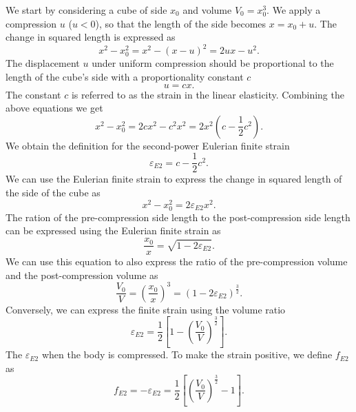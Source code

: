 We start by considering a cube of side $x_0$ and volume $V_0 = x_0^3$. We
apply a compression $u$ ($u < 0$), so that the length of the side becomes
$x = x_0 + u$. The change in squared length is expressed as
\begin{equation}
  x^2 - x_0^2 = x^2 - (x - u)^2 = 2ux - u^2.
\end{equation}
The displacement $u$ under uniform compression should be proportional to the
length of the cube's side with a proportionality constant $c$
\begin{equation}
  u = cx.
\end{equation}
The constant $c$ is referred to as the strain in the linear elasticity.
Combining the above equations we get
\begin{equation}
  x^2 - x_0^2 = 2cx^2 - c^2x^2 = 2x^2(c - \frac{1}{2}c^2).
\end{equation}
We obtain the definition for the second-power Eulerian finite strain
\begin{equation}
  \varepsilon_{E2} = c - \frac{1}{2}c^2.
\end{equation}
We can use the Eulerian finite strain to express the change in squared length
of the side of the cube as
\begin{equation}
  x^2 - x_0^2 = 2\varepsilon_{E2}x^2.
\end{equation}
The ration of the pre-compression side length to the post-compression side
length can be expressed using the Eulerian finite strain as
\begin{equation}
  \frac{x_0}{x} = \sqrt{1 - 2\varepsilon_{E2}}.
\end{equation}
We can use this equation to also express the ratio of the pre-compression
volume and the post-compression volume as
\begin{equation}
  \frac{V_0}{V} = \left(\frac{x_0}{x}\right)^3 =
  \left(1 - 2 \varepsilon_{E2}\right)^{\frac{3}{2}}.
\end{equation}
Conversely, we can express the finite strain using the volume ratio
\begin{equation}
  \varepsilon_{E2} = \frac{1}{2} \left[
    1 - \left(\frac{V_0}{V}\right)^{\frac{3}{2}}
  \right].
\end{equation}
The $\varepsilon_{E2}$ when the body is compressed. To make the strain
positive, we define $f_{E2}$ as
\begin{equation}
  f_{E2} = -\varepsilon_{E2} = \frac{1}{2} \left[
    \left(\frac{V_0}{V}\right)^{\frac{3}{2}} - 1
  \right].
  \label{eq:finite-strain}
\end{equation}
